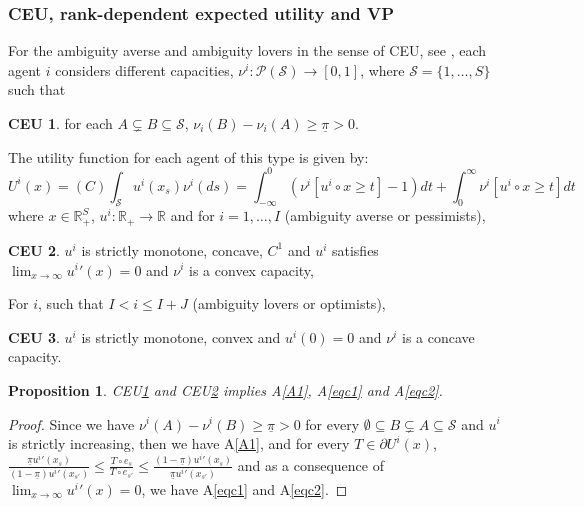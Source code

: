 \documentclass[pdftex]{article}
\numberwithin{equation}{section}
\theoremstyle{th}
\newtheorem{prop}{{Proposition}}%
\newtheorem{proof lemma}{{Proof Lemma}.}
\theoremstyle{definition}
\newtheorem{ceu}{CEU\hspace{-0.15cm}}
\newtheorem*{risk lovers}{Risk lovers}
\newtheorem*{risk averse}{Risk averse}
\begin{document}
\subsubsection{CEU, rank-dependent expected utility and VP}

For the ambiguity averse and ambiguity lovers in the sense of CEU, see \cite{Schmeidler}, each agent $i$ considers different capacities, $\nu^i:\mathcal{P}\left(\mathcal{S}\right)\rightarrow[0,1]$, where $\mathcal{S}=\{1,\dots,S\}$ such that \begin{ceu}\label{CEU1} for each $A\subsetneq{B}\subseteq\mathcal{S}$, $\nu_{i}(B)-\nu_{i}(A)\geq{\underline{\pi}}>0$.\end{ceu}

The utility function for each agent of this type is given by:
\[
U^i(x)=(C)\int_{\mathcal{S}}{u}^i(x_s)\nu^i(ds)={\int}_{-\infty}^0\left(\nu^i\left[{u}^i\circ{x}{\geq}{t}\right]-1\right)dt+\int_0^{\infty}\nu^i\left[{u}^i\circ{x}{\geq}{t}\right]dt
\]
where $x\in\mathbb{R}_+^S$, ${u^i}:\mathbb{R}_+\rightarrow\mathbb{R}$ and for $i=1,\dots,I$ (ambiguity averse or pessimists), \begin{ceu}\label{CEU2}${u^i}$ is strictly monotone, concave, $C^1$ and ${u^i}$ satisfies $\lim_{x\rightarrow\infty}{u^i}'(x)=0$ and $\nu^i$ is a convex capacity,\end{ceu} For $i$, such that $I<i\leq{I}+J$ (ambiguity lovers or optimists), \begin{ceu}\label{CEU3}${u^i}$ is strictly monotone, convex and ${u^i}(0)=0$ and $\nu^i$ is a concave capacity.\end{ceu}

\begin{prop}
\label{propCEU}
CEU\ref{CEU1} and CEU\ref{CEU2} implies A\ref{A1}, A\ref{eqc1} and A\ref{eqc2}.
\end{prop}
\begin{proof}
Since we have $\nu^i(A)-\nu^i(B)\geq\underline{\pi}>0$ for every $\emptyset\subseteq{B}\subsetneq{A}\subseteq\mathcal{S}$ and $u^i$ is strictly increasing, then  we have A\ref{A1}, and for every $T\in\partial{U}^i(x)$, $\frac{\underline{\pi}{u^i}'\!\!\left(x_{s}\right)}{\left(1-\underline{\pi}\right){u^i}'\!\!\left(x_{s'}\right)}\leq\frac{T\circ{e_s}}{T\circ{e_{s'}}}\leq\frac{\left(1-\underline{\pi}\right){u^i}'\!\!\left(x_{s}\right)}{\underline{\pi}{u^i}'\!\!\left(x_{s'}\right)}$ and as a consequence of $\lim_{x\rightarrow\infty}{u^i}'(x)=0$, we have A\ref{eqc1} and A\ref{eqc2}.
\end{proof}
\end{document}
